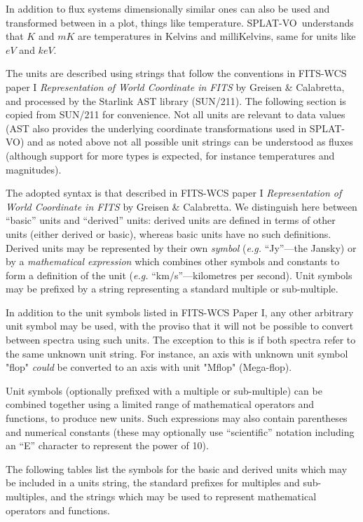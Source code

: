 \documentclass[twoside,11pt]{article}
\newcommand{\xref}[3]{#1}
\renewcommand{\_}{\texttt{\symbol{95}}}
\newcommand{\SPLAT}{\textsf{SPLAT-VO}}
\begin{document}
In addition to flux systems dimensionally similar ones can also be used and
transformed between in a plot, things like temperature. \SPLAT\ understands
that $K$ and $mK$ are temperatures in Kelvins and milliKelvins, same for units
like $eV$ and $keV$.

The units are described using strings that follow the conventions in FITS-WCS
paper I \textit{Representation of World Coordinate in FITS} by Greisen \&
Calabretta, and processed by the Starlink AST library
(\xref{SUN/211}{sun211}{ss:unitsyntax}).
The following section is copied from SUN/211 for convenience. Not all units
are relevant to data values (AST also provides the underlying coordinate
transformations used in \SPLAT) and as noted above not all possible unit
strings can be understood as fluxes (although support for more types is
expected, for instance temperatures and magnitudes).

The adopted syntax is that described in FITS-WCS paper I \textit{Representation
of World Coordinate in FITS} by Greisen \& Calabretta. We distinguish
here between ``basic'' units and ``derived'' units: derived units are
defined in terms of other units (either derived or basic), whereas basic
units have no such definitions. Derived units may be represented by their
own \emph{symbol} (\emph{e.g.} ``Jy''---the Jansky) or by a
\emph{mathematical expression} which combines other symbols and constants
to form a definition of the unit (\emph{e.g.} ``km/s''---kilometres per
second). Unit symbols may be prefixed by a string representing a standard
multiple or sub-multiple.

In addition to the unit symbols listed in FITS-WCS Paper I, any other
arbitrary unit symbol may be used, with the proviso that it will not be
possible to convert between spectra using such units. The exception to
this is if both spectra refer to the same unknown unit string. For instance,
an axis with unknown unit symbol "flop" \emph{could} be converted to an axis
with unit "Mflop" (Mega-flop).

Unit symbols (optionally prefixed with a multiple or sub-multiple) can be
combined together using a limited range of mathematical operators and
functions, to produce new units. Such expressions may also contain
parentheses and numerical constants (these may optionally use
``scientific'' notation including an ``E'' character to represent the
power of 10).

The following tables list the symbols for the basic and derived units which
may be included in a units string, the standard prefixes for multiples
and sub-multiples, and the strings which may be used to represent
mathematical operators and functions.
\end{document}
